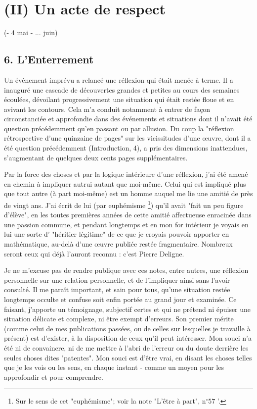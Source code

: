 \section{(II) Un acte de respect}

(- 4 mai - ... juin)

\subsection{6. L'Enterrement}

Un événement imprévu a relancé une réflexion qui était menée à terme. Il a inauguré une cascade de découvertes grandes et petites au cours des semaines écoulées, dévoilant progressivement une situation qui était restée floue et en avivant les contours. Cela m'a conduit notamment à entrer de façon circonstanciée et approfondie dans des événements et situations dont il n'avait été question précédemment qu'en passant ou par allusion. Du coup la "réflexion rétrospective d'une quinzaine de pages" sur les vicissitudes d'une œuvre, dont il a été question précédemment (Introduction, 4), a pris des dimensions inattendues, s'augmentant de quelques deux cents pages supplémentaires.

Par la force des choses et par la logique intérieure d'une réflexion, j'ai été amené en chemin à impliquer autrui autant que moi-même. Celui qui est impliqué plus que tout autre (à part moi-même) est un homme auquel me lie une amitié de près de vingt ans. J'ai écrit de lui (par euphémisme \footnote{Sur le sens de cet "euphémisme"; voir la note "L'être à part", $\mathrm{n}^{\circ} 57$ '.}) qu'il avait "fait un peu figure d'élève", en les toutes premières années de cette amitié affectueuse enracinée dans une passion commune, et pendant longtemps et en mon for intérieur je voyais en lui une sorte d' "héritier légitime" de ce que je croyais pouvoir apporter en mathématique, au-delà d'une œuvre publiée restée fragmentaire. Nombreux seront ceux qui déjà l'auront reconnu : c'est Pierre Deligne.

Je ne m'excuse pas de rendre publique avec ces notes, entre autres, une réflexion personnelle sur une relation personnelle, et de l'impliquer ainsi sans l'avoir consulté. Il me paraît important, et sain pour tous, qu'une situation restée longtemps occulte et confuse soit enfin portée au grand jour et examinée. Ce faisant, j'apporte un témoignage, subjectif certes et qui ne prétend ni épuiser une situation délicate et complexe, ni être exempt d'erreurs. Son premier mérite (comme celui de mes publications passées, ou de celles sur lesquelles je travaille à présent) est d'exister, à la disposition de ceux qu'il peut intéresser. Mon souci n'a été ni de convaincre, ni de me mettre à l'abri de l'erreur ou du doute derrière les seules choses dites "patentes". Mon souci est d'être vrai, en disant les choses telles que je les vois ou les sens, en chaque instant - comme un moyen pour les approfondir et pour comprendre.

